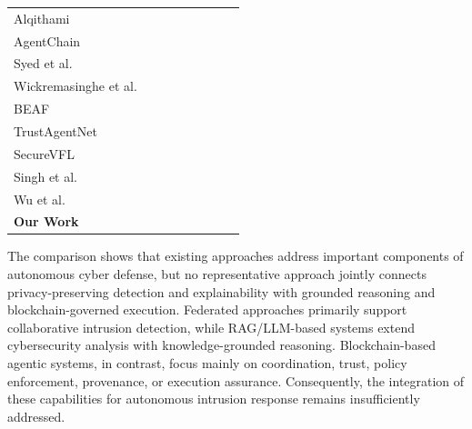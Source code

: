 \documentclass[10pt, conference]{IEEEtran}
\newcommand{\cmark}{\textcolor{green!60!black}{\checkmark}}
\newcommand{\xmark}{\textcolor{red}{\texttimes}}
\begin{document}
\begin{table}[!t]
\begin{tabularx}{\textwidth}{@{}>{\raggedright\arraybackslash}p{1.8cm}|CCCC|CCC@{}}
Alqithami~\cite{alqithami2026}
& \xmark & \xmark & \cmark & \cmark
& \cmark & \xmark & \xmark \\
AgentChain~\cite{chen2026agentchain}
& \xmark & \xmark & \cmark & \cmark
& \xmark & \cmark & \xmark \\
Syed et al.~\cite{syed2025agentic}
& \xmark & \xmark & \cmark & \cmark
& \xmark & \cmark & \xmark \\
Wickremasinghe et al.~\cite{wickremasinghe2026state}
& \xmark & \xmark & \xmark & \cmark
& \xmark & \cmark & \xmark \\
BEAF~\cite{rahmati2025beaf}
& \xmark & \xmark & \xmark & \cmark
& \cmark & \cmark & \xmark \\
TrustAgentNet~\cite{gao2025trustagentnet}
& \xmark & \xmark & \cmark & \cmark
& \xmark & \cmark & \xmark \\
SecureVFL~\cite{fan2025}
& \cmark & \xmark & \xmark & \xmark
& \xmark & \xmark & \xmark \\
Singh et al.~\cite{singh2025zt}
& \xmark & \xmark & \xmark & \xmark
& \cmark & \cmark & \xmark \\
Wu et al.~\cite{wu2023falcon}
& \xmark & \cmark & \xmark & \xmark
& \xmark & \xmark & \xmark \\

\textbf{Our Work}
& \cmark & \cmark & \cmark & \cmark
& \cmark & \cmark & \cmark \\
\hline
\end{tabularx}
\end{table}

The comparison shows that existing approaches address important components of autonomous cyber defense, but no representative approach jointly connects privacy-preserving detection and explainability with grounded reasoning and blockchain-governed execution. Federated approaches primarily support collaborative intrusion detection, while RAG/LLM-based systems extend cybersecurity analysis with knowledge-grounded reasoning. Blockchain-based agentic systems, in contrast, focus mainly on coordination, trust, policy enforcement, provenance, or execution assurance. Consequently, the integration of these capabilities for autonomous intrusion response remains insufficiently addressed.
\end{document}
